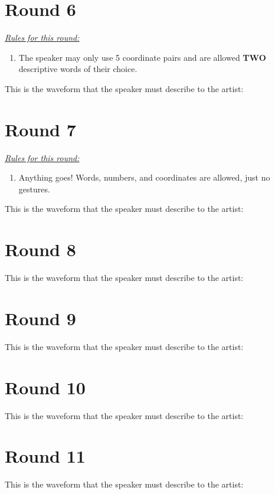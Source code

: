 \documentclass[12pt]{article}
\newcommand{\ben}{\begin{enumerate}}
\newcommand{\een}{\end{enumerate}}
\begin{document}
\newpage
\section*{Round 6}
\vspace{5mm}
\underline{\textit{Rules for this round:}}
\ben
	\item{The speaker may only use 5 coordinate pairs and are allowed \textbf{TWO} descriptive words of their choice.}
\een
\vspace{20mm}
This is the waveform that the speaker must describe to the artist:

\newpage
\section*{Round 7}
\vspace{5mm}
\underline{\textit{Rules for this round:}}
\ben
	\item{Anything goes! Words, numbers, and coordinates are allowed, just no gestures.}
\een
\vspace{20mm}
This is the waveform that the speaker must describe to the artist:

\newpage
\section*{Round 8}
\vspace{5mm}
This is the waveform that the speaker must describe to the artist:

\newpage
\section*{Round 9}
\vspace{5mm}
This is the waveform that the speaker must describe to the artist:

\newpage
\section*{Round 10}
\vspace{5mm}
This is the waveform that the speaker must describe to the artist:

\newpage
\section*{Round 11}
\vspace{5mm}
This is the waveform that the speaker must describe to the artist:
\end{document}
